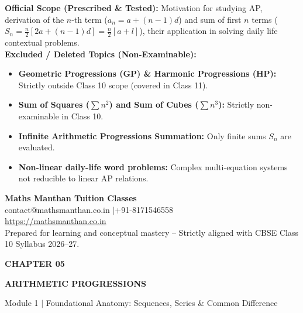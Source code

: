 \documentclass[10pt,a4paper]{article}
\newcommand{\chapterbanner}[4]{%
  \begin{tcolorbox}[enhanced,colback=bluepale,colframe=bluepale,boxrule=0pt,arc=2mm,
    left=3.5mm,right=3.5mm,top=1.6mm,bottom=1.6mm]
    {\footnotesize\bfseries\color{gold}CHAPTER #1\hfill\color{blue}#4}\par\vspace{0.3mm}
    {\Large\bfseries\color{navy}#2}\par
    {\small\color{muted}#3}
  \end{tcolorbox}\vspace{0.6mm}
}
\newcommand{\CoreTag}{\tcbox[colback=greenpale,colframe=green!40,boxrule=.3pt,arc=1mm,left=1.5mm,right=1.5mm,top=.4mm,bottom=.4mm]{\scriptsize\bfseries\color{green}CORE SYLLABUS}}
\begin{document}
\vspace{1.5mm}
\begin{warningBox}[title=CBSE 2026--27 Curriculum Verification \& Rationalized Scope,fonttitle=\bfseries\color{navy}]
  \textbf{Official Scope (Prescribed \& Tested):} Motivation for studying AP, derivation of the $n$-th term ($a_n = a + (n-1)d$) and sum of first $n$ terms ($S_n = \frac{n}{2}[2a+(n-1)d] = \frac{n}{2}[a+l]$), their application in solving daily life contextual problems.\\
  \textbf{Excluded / Deleted Topics (Non-Examinable):}
  \begin{itemize}
    \item \textbf{Geometric Progressions (GP) \& Harmonic Progressions (HP):} Strictly outside Class 10 scope (covered in Class 11).
    \item \textbf{Sum of Squares ($\sum n^2$) and Sum of Cubes ($\sum n^3$):} Strictly non-examinable in Class 10.
    \item \textbf{Infinite Arithmetic Progressions Summation:} Only finite sums $S_n$ are evaluated.
    \item \textbf{Non-linear daily-life word problems:} Complex multi-equation systems not reducible to linear AP relations.
  \end{itemize}
\end{warningBox}

\vfill
\begin{center}
  {\small\bfseries\color{navy}Maths Manthan Tuition Classes}\\
  {\footnotesize\color{muted}contact@mathsmanthan.co.in \quad$\vert$\quad +91-8171546558}\\
  {\footnotesize\url{https://mathsmanthan.co.in}}\\[1.2mm]
  {\scriptsize\color{muted}Prepared for learning and conceptual mastery \;--\; Strictly aligned with CBSE Class 10 Syllabus 2026--27.}
\end{center}

\clearpage

\thispagestyle{fancy}
\vspace*{0mm}

\chapterbanner{05}{ARITHMETIC PROGRESSIONS}{Module 1 $\vert$ Foundational Anatomy: Sequences, Series \& Common Difference}{\CoreTag}
\end{document}
